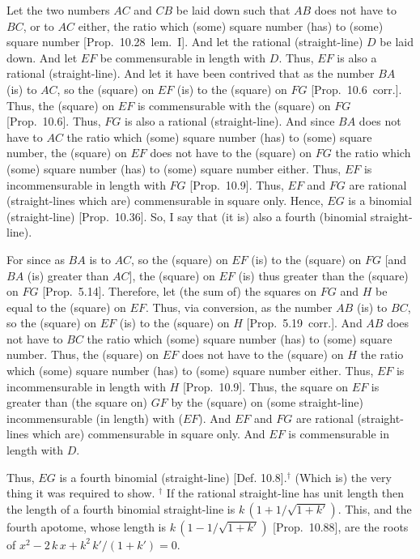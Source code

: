 Let the two numbers $AC$ and $CB$ be laid down such that $AB$ does not have to $BC$,  or to $AC$ either, the ratio which (some) square number
(has) to (some) square number [Prop.~10.28~lem.~I].
And let the rational (straight-line) $D$ be laid down. And let $EF$ be
commensurable in length with $D$. Thus, $EF$ is also a rational (straight-line). And let it have been contrived that as the number $BA$ (is) to
$AC$, so the (square) on $EF$ (is) to the (square) on $FG$ [Prop.~10.6~corr.]. Thus, the (square) on $EF$
is commensurable with the (square) on $FG$ [Prop.~10.6]. Thus, $FG$ is also a rational (straight-line). And since $BA$ does not have to $AC$ the ratio which (some)
square number (has) to (some) square number,  the (square) on $EF$
does not have to the (square) on $FG$ the ratio which (some) square number
(has) to (some) square number either. Thus, $EF$ is incommensurable in length with $FG$ [Prop.~10.9]. Thus, $EF$ and
$FG$ are rational (straight-lines which are) commensurable in square only.
Hence, $EG$ is a binomial (straight-line) [Prop.~10.36]. So, I say that (it is) also
a fourth (binomial straight-line).

For since as $BA$ is to $AC$, so the (square) on $EF$ (is) to the (square) on
$FG$ [and $BA$ (is) greater than $AC$], the (square) on $EF$ (is) thus
greater than the (square) on $FG$ [Prop.~5.14]. Therefore, let (the sum of) the squares on
$FG$ and $H$ be equal to the (square) on $EF$. Thus, via conversion,
as the number $AB$ (is) to $BC$, so the (square) on $EF$ (is) to the
(square) on $H$ [Prop.~5.19~corr.]. And $AB$
does not have to $BC$ the ratio which (some) square number (has) to (some)
square number. Thus, the (square) on $EF$ does not have to the
(square) on $H$ the ratio which (some) square number (has) to (some) square
number either. Thus, $EF$ is incommensurable in length with $H$ [Prop.~10.9]. Thus, the square on $EF$ is greater than (the square on) $GF$ by the (square) on (some straight-line)
incommensurable (in length) with ($EF$). And $EF$ and $FG$ are rational (straight-lines which are) commensurable in square only.  And $EF$ is commensurable
in length with $D$.

Thus, $EG$ is a fourth binomial (straight-line) [Def. 10.8].$^\dag$ (Which is) the very thing
it was required to show.
{\footnotesize\noindent $^\dag$ If the rational straight-line has unit length then the length of a fourth binomial straight-line
is  $k\,(1+1/\sqrt{1+k'})$. This, and the fourth apotome,
whose length is $k\,(1-1/\sqrt{1+k'})$ [Prop.~10.88],
are the roots of $x^2- 2\,k\,x+k^2\,k'/(1+k')=0$.}

